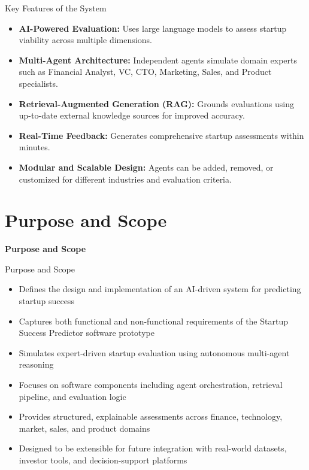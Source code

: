 \documentclass{beamer}
\begin{document}
\begin{frame}{Key Features of the System}
\begin{itemize}
    \item \textbf{AI-Powered Evaluation:} Uses large language models to assess startup viability across multiple dimensions.
    \item \textbf{Multi-Agent Architecture:} Independent agents simulate domain experts such as Financial Analyst, VC, CTO, Marketing, Sales, and Product specialists.
    \item \textbf{Retrieval-Augmented Generation (RAG):} Grounds evaluations using up-to-date external knowledge sources for improved accuracy.
    
    \item \textbf{Real-Time Feedback:} Generates comprehensive startup assessments within minutes.
    \item \textbf{Modular and Scalable Design:} Agents can be added, removed, or customized for different industries and evaluation criteria.
\end{itemize}
\end{frame}


\section{Purpose and Scope}

\begin{frame}
\centering
\Huge \textbf{Purpose and Scope}
\end{frame}

\begin{frame}{Purpose and Scope}
\begin{itemize}
    \item Defines the design and implementation of an AI-driven system for predicting startup success
    \item Captures both functional and non-functional requirements of the Startup Success Predictor software prototype
    \item Simulates expert-driven startup evaluation using autonomous multi-agent reasoning
    \item Focuses on software components including agent orchestration, retrieval pipeline, and evaluation logic
    \item Provides structured, explainable assessments across finance, technology, market, sales, and product domains
    \item Designed to be extensible for future integration with real-world datasets, investor tools, and decision-support platforms
\end{itemize}
\end{frame}
\end{document}
